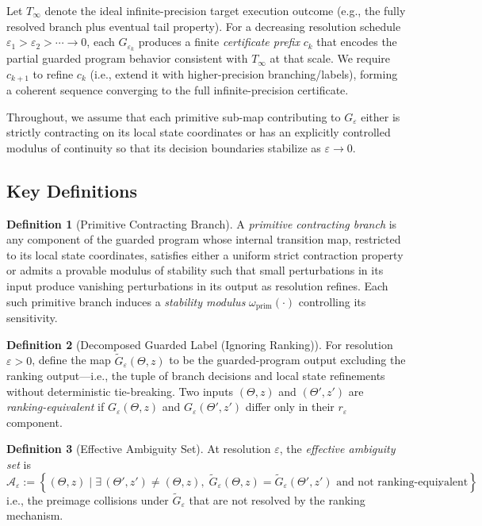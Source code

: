\documentclass[12pt]{article}
\theoremstyle{definition}
\newtheorem{definition}{Definition}[section]
\theoremstyle{plain}
\begin{document}
Let \(T_\infty\) denote the ideal infinite-precision target execution outcome (e.g., the fully resolved branch plus eventual tail property). For a decreasing resolution schedule \(\varepsilon_1>\varepsilon_2>\cdots\to 0\), each \(G_{\varepsilon_k}\) produces a finite \emph{certificate prefix} \(c_k\) that encodes the partial guarded program behavior consistent with \(T_\infty\) at that scale. We require \(c_{k+1}\) to refine \(c_k\) (i.e., extend it with higher-precision branching/labels), forming a coherent sequence converging to the full infinite-precision certificate.

Throughout, we assume that each primitive sub-map contributing to \(G_\varepsilon\) either is strictly contracting on its local state coordinates or has an explicitly controlled modulus of continuity so that its decision boundaries stabilize as \(\varepsilon\to0\). 

\subsection{Key Definitions}
\label{sub:dbd-definitions}

\begin{definition}[Primitive Contracting Branch]
A \emph{primitive contracting branch} is any component of the guarded program whose internal transition map, restricted to its local state coordinates, satisfies either a uniform strict contraction property or admits a provable modulus of stability such that small perturbations in its input produce vanishing perturbations in its output as resolution refines. Each such primitive branch induces a \emph{stability modulus} \(\omega_{\mathrm{prim}}(\cdot)\) controlling its sensitivity.
\end{definition}

\begin{definition}[Decomposed Guarded Label (Ignoring Ranking)]
For resolution \(\varepsilon>0\), define the map \(\tilde G_\varepsilon(\Theta,z)\) to be the guarded-program output excluding the ranking output—i.e., the tuple of branch decisions and local state refinements without deterministic tie-breaking. Two inputs \((\Theta,z)\) and \((\Theta',z')\) are \emph{ranking-equivalent} if \(G_\varepsilon(\Theta,z)\) and \(G_\varepsilon(\Theta',z')\) differ only in their \(r_\varepsilon\) component.
\end{definition}

\begin{definition}[Effective Ambiguity Set]
At resolution \(\varepsilon\), the \emph{effective ambiguity set} is
\[
\mathcal A_\varepsilon
:=
\left\{
(\Theta,z)\;\big|\;
\exists\, (\Theta',z')\neq (\Theta,z),\;
\tilde G_\varepsilon(\Theta,z)=\tilde G_\varepsilon(\Theta',z')
\text{ and not ranking-equivalent}
\right\},
\]
i.e., the preimage collisions under \(\tilde G_\varepsilon\) that are not resolved by the ranking mechanism.
\end{definition}
\end{document}

